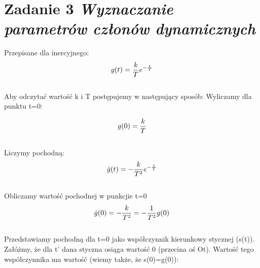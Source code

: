 \documentclass[a4paper,10pt]{article}
\begin{document}

\section{Zadanie 3 \textit{\small Wyznaczanie parametrów członów dynamicznych}}\label{sec:zad3}

Przepisane dla inercyjnego:
	\begin{eqnarray} 
		g(t)={k \over T} e^{-{t \over T}}
	\end{eqnarray}\\
	
Aby odczytać wartość k i T postępujemy w następujący sposób:
Wyliczamy dla punktu t=0:

	\begin{eqnarray} 
		g(0)={k \over T}
	\end{eqnarray}\\
	Liczymy pochodną:
	\begin{eqnarray} 
		\dot{g}(t)=-{k \over T^{2}} e^{-{t \over T}}
	\end{eqnarray}\\
	Obliczamy wartość pochodnej w punkcjie t=0
	\begin{eqnarray} 
		\dot{g}(0)=-{k \over T^{2}}=-{1 \over T^{2}}g(0)
	\end{eqnarray}\\
Przedstawiamy pochodną dla t=0 jako współczynnik kierunkowy stycznej (s(t)). Załóżmy, że dla t’
dana styczna osiąga wartość 0 (przecina oś Ot). Wartość tego współczynnika ma wartość (wiemy
także, że s(0)=g(0)):
\end{document}

